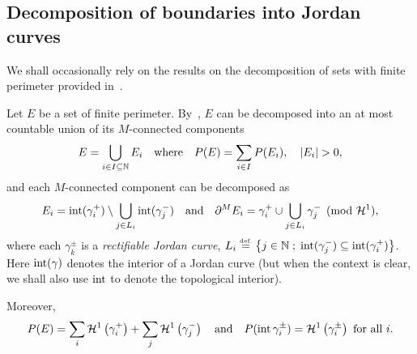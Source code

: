 \subsection{Decomposition of boundaries into Jordan curves}\label{sec:jordan_decomp}
We shall occasionally rely on the results on the decomposition of sets with finite perimeter provided in~\cite{ambcasmas99}.

 Let $E$ be a set of finite perimeter. By~\cite[Corollary 1]{ambcasmas99}, $E$ can be decomposed into an at most countable union of its $M$-connected components
\begin{equation*}
  E =\bigcup_{i\in I \subseteq \NN} E_{i} \qwhereq P(E)=\sum_{i\in I} P(E_{i}), \quad \abs{E_{i}}>0,
\end{equation*}
and each $M$-connected component can be decomposed as 
$$
E_{i}=\operatorname{int}(\gamma_i^+)\setminus \bigcup_{j\in L_i}\operatorname{int}(\gamma_j^-)\quad \text{and} \quad \partial^M E_{i} = \gamma_i^+ \cup \bigcup_{j\in L_i} \gamma_j^- \pmod{\mathcal{H}^{1}},
$$ where each $\gamma_k^{\pm}$ is a \textit{rectifiable Jordan curve}, $L_i\stackrel{\mbox{\upshape\tiny def.}}{=}\left\{ j\in \mathbb{N} \;;\; \operatorname{int}(\gamma_j^-)\subseteq \operatorname{int}(\gamma_i^+) \right\}$. Here $\operatorname{int}(\gamma)$ denotes the interior of a Jordan curve (but when the context is clear, we shall also use $\operatorname{int}$ to denote the topological interior).

Moreover,
\begin{equation*}
  P(E)=\sum_i \mathcal{H}^{1}\left({\gamma_i^+}\right) +\sum_j \mathcal{H}^{1}\left({\gamma_j^-}\right) \quad \text{and} \quad P(\operatorname{int} \gamma_i^\pm)= \mathcal{H}^{1}\left({\gamma_i^\pm}\right) \mbox{ for all } i.
\end{equation*}

